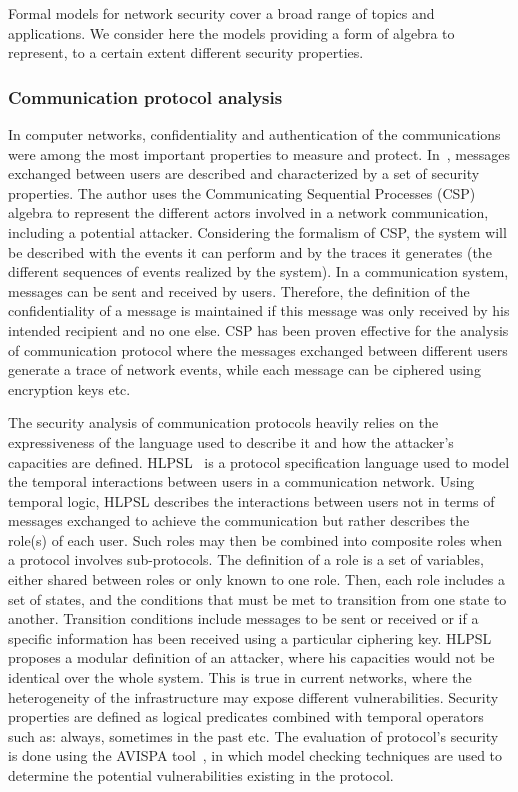 Formal models for network security cover a broad range of topics and applications.
We consider here the models providing a form of algebra to represent, to a certain extent different security properties.

\subsubsection{Communication protocol analysis}
In computer networks, confidentiality and authentication of the communications were among the most important properties to measure and protect.
In~\cite{CSP-Schneider1996}, messages exchanged between users are described and characterized by a set of security properties.
The author uses the Communicating Sequential Processes (CSP) algebra to represent the different actors involved in a network communication, including a potential attacker. 
Considering the formalism of CSP, the system will be described with the events it can perform and by the traces it generates (\ie the different sequences of events realized by the system).
In a communication system, messages can be sent and received by users.
Therefore, the definition of the confidentiality of a message is maintained if this message was only received by his intended recipient and no one else.
CSP has been proven effective for the analysis of communication protocol where the messages exchanged between different users generate a trace of network events, while each message can be ciphered using encryption keys etc.

The security analysis of communication protocols heavily relies on the expressiveness of the language used to describe it and how the attacker's capacities are defined. HLPSL~\cite{HLPSL-Chevalier2004} is a protocol specification language used to model the temporal interactions between users in a communication network. Using temporal logic, HLPSL describes the interactions between users not in terms of messages exchanged to achieve the communication but rather describes the role(s) of each user. Such roles may then be combined into composite roles when a protocol involves sub-protocols.
The definition of a role is a set of variables, either shared between roles or only known to one role.
Then, each role includes a set of states, and the conditions that must be met to transition from one state to another. Transition conditions include messages to be sent or received or if a specific information has been received using a particular ciphering key.
HLPSL proposes a modular definition of an attacker, where his capacities would not be identical over the whole system.
This is true in current networks, where the heterogeneity of the infrastructure may expose different vulnerabilities.
Security properties are defined as logical predicates combined with temporal operators such as: always, sometimes in the past etc.
The evaluation of protocol's security is done using the AVISPA tool~\cite{avispa}, in which model checking techniques are used to determine the potential vulnerabilities existing in the protocol.

